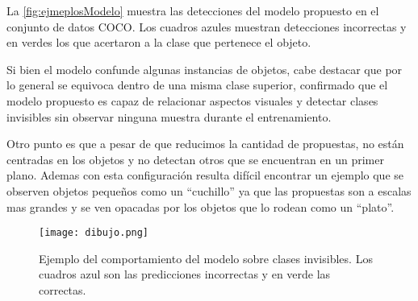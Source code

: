 La \autoref{fig:ejmeplosModelo} muestra las detecciones del modelo propuesto en el conjunto de datos COCO. Los cuadros azules muestran detecciones incorrectas y en verdes los que acertaron a la clase que pertenece el objeto. 

Si bien el modelo confunde algunas instancias de objetos, cabe destacar que por lo general se equivoca dentro de una misma clase superior, confirmado que el modelo propuesto es capaz de relacionar aspectos visuales y detectar clases invisibles sin observar ninguna muestra durante el entrenamiento. 

Otro punto es que a pesar de que reducimos la cantidad de propuestas, no están centradas en los objetos y no detectan otros que se encuentran en un primer plano. Ademas con esta configuración resulta difícil encontrar un ejemplo que se observen objetos pequeños como  un ``cuchillo'' ya que las propuestas son a escalas mas grandes y se ven opacadas por los objetos que lo rodean como un ``plato''.

\begin{figure}[]
	\texttt{[image: dibujo.png]}
	\caption{Ejemplo del comportamiento del modelo sobre clases invisibles. Los cuadros azul son las predicciones incorrectas y en verde las correctas.}
	\label{fig:ejmeplosModelo}
\end{figure}
